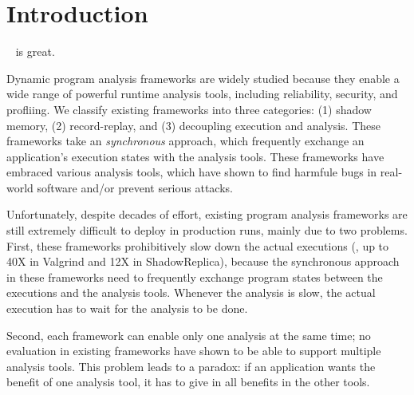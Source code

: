 \section{Introduction} \label{sec:intro}

\paxos~\cite{paxos} is great.


Dynamic program analysis frameworks are widely studied because they enable a 
wide range of powerful runtime analysis tools, including reliability, security, 
and profliing. We classify existing frameworks into three categories: (1) 
shadow memory, (2) record-replay, and (3) decoupling execution and 
analysis. These frameworks take an \emph{synchronous} approach, which 
frequently exchange an application's execution states with the analysis tools. 
These frameworks have embraced various analysis tools, which have shown to find 
harmfule bugs in real-world software and/or prevent serious attacks.





Unfortunately, despite decades of effort, existing program analysis frameworks 
are still extremely difficult to deploy in production runs, mainly due to two 
problems. First, these frameworks prohibitively slow down the actual executions 
(\eg, up to 40X in Valgrind and 12X in ShadowReplica), because the synchronous 
approach in these frameworks need to frequently exchange program states between 
the executions and the analysis tools. Whenever the analysis is slow, the 
actual execution has to wait for the analysis to be done.

Second, each framework can enable only one analysis at the same time; no 
evaluation in existing frameworks have shown to be able to support multiple 
analysis tools. This problem leads to a paradox: if an application wants 
the benefit of one analysis tool, it has to give in all benefits in the other 
tools.

